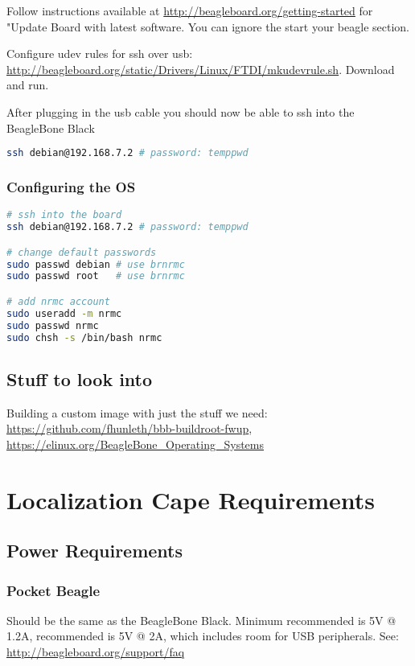 \documentclass[]{book}
\begin{document}
Follow instructions available at \url{http://beagleboard.org/getting-started} for "Update Board with latest software. You can ignore the start your beagle section.

Configure udev rules for ssh over usb: \url{http://beagleboard.org/static/Drivers/Linux/FTDI/mkudevrule.sh}. Download and run.

After plugging in the usb cable you should now be able to ssh into the BeagleBone Black

\begin{lstlisting}[language=bash]
ssh debian@192.168.7.2 # password: temppwd
\end{lstlisting}

\pagebreak
\subsection{Configuring the OS}
\begin{lstlisting}[language=bash]
# ssh into the board
ssh debian@192.168.7.2 # password: temppwd

# change default passwords
sudo passwd debian # use brnrmc
sudo passwd root   # use brnrmc

# add nrmc account
sudo useradd -m nrmc
sudo passwd nrmc
sudo chsh -s /bin/bash nrmc

\end{lstlisting}


\section{Stuff to look into}
Building a custom image with just the stuff we need: \url{https://github.com/fhunleth/bbb-buildroot-fwup}, \url{https://elinux.org/BeagleBone_Operating_Systems}

\chapter{Localization Cape Requirements}
\section{Power Requirements}
\subsection{Pocket Beagle}
Should be the same as the BeagleBone Black. Minimum recommended is 5V @ 1.2A, recommended is 5V @ 2A, which includes room for USB peripherals. See: \url{http://beagleboard.org/support/faq}
\end{document}
